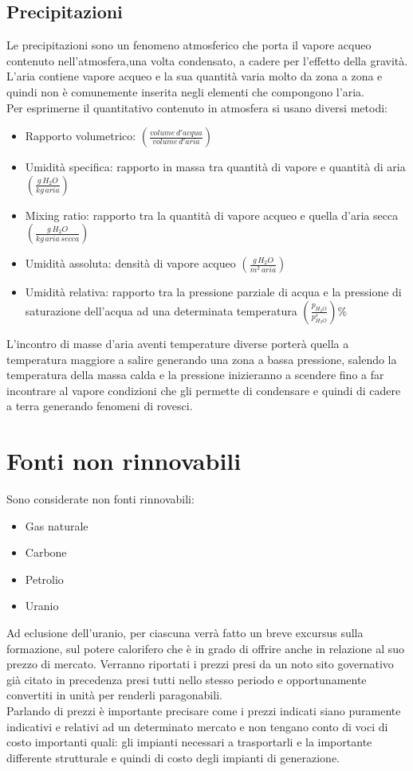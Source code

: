 \subsection{Precipitazioni}
Le precipitazioni sono un fenomeno atmosferico che porta il vapore acqueo contenuto nell'atmosfera,una volta condensato, a cadere per l'effetto della gravità.\\
L'aria contiene vapore acqueo e la sua quantità varia molto da zona a zona e quindi non è comunemente inserita negli elementi che compongono l'aria.\\
Per esprimerne il quantitativo contenuto in atmosfera si usano diversi metodi:
\begin{itemize}
    \item Rapporto volumetrico: $(\frac{volume\,  d'acqua}{volume\,  d'aria})$
    \item Umidità specifica: rapporto in massa tra quantità di vapore e quantità di aria  $(\frac{g\, H_2O}{kg\, aria})$
    \item Mixing ratio: rapporto tra la quantità di vapore acqueo e quella d'aria secca $(\frac{g\, H_2O}{kg\, aria\, secca})$
    \item Umidità assoluta: densità di vapore acqueo $(\frac{g\, H_2O}{m^3\, aria})$
    \item Umidità relativa: rapporto tra la pressione parziale di acqua e la pressione di saturazione dell'acqua ad una determinata temperatura $(\frac{p_{H_2O} }{p_{H_2O}^s})\%$
\end{itemize}
L'incontro di masse d'aria aventi temperature diverse porterà quella a temperatura maggiore a salire generando una zona a bassa pressione, salendo la temperatura della massa calda e la pressione inizieranno a scendere fino a far incontrare al vapore condizioni che gli permette di condensare e quindi di cadere a terra generando fenomeni di rovesci.\\
\newpage
\section{Fonti non rinnovabili}
Sono considerate non fonti rinnovabili:
\begin{itemize}
    \item Gas naturale
    \item Carbone
    \item Petrolio
    \item Uranio
\end{itemize}
Ad eclusione dell'uranio, per ciascuna verrà fatto un breve excursus sulla formazione, sul potere calorifero che è in grado di offrire anche in relazione al suo prezzo di mercato. Verranno riportati i prezzi presi da un noto sito governativo già citato in precedenza presi tutti nello stesso periodo e opportunamente convertiti in unità per renderli paragonabili.\\
Parlando di prezzi è importante precisare come i prezzi indicati siano puramente indicativi e relativi ad un determinato mercato e non tengano conto di voci di costo importanti quali: gli impianti necessari a trasportarli e la importante differente strutturale e quindi di costo degli impianti di generazione.\\
